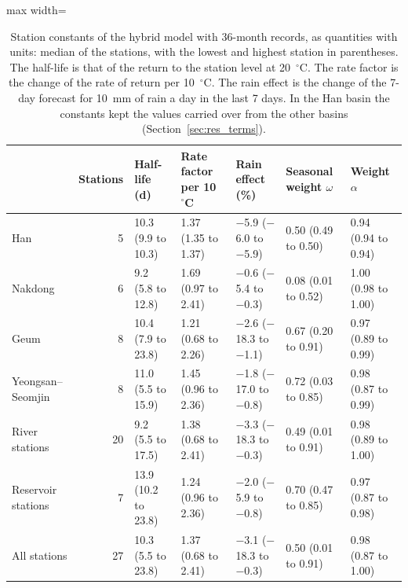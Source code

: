\begin{table}[tbp]
\centering
\caption{Station constants of the hybrid model with 36-month records, as quantities with units: median of the stations, with the lowest and highest station in parentheses. The half-life is that of the return to the station level at 20~$^\circ$C. The rate factor is the change of the rate of return per 10~$^\circ$C. The rain effect is the change of the 7-day forecast for 10~mm of rain a day in the last 7 days. In the Han basin the constants kept the values carried over from the other basins (Section~\ref{sec:res_terms}).}
\label{tab:fitted}
\footnotesize
\setlength{\tabcolsep}{4pt}
\begin{adjustbox}{max width=\textwidth}
\begin{tabular}{lrlllll}
\toprule
 & Stations & Half-life (d) & Rate factor per 10~$^\circ$C & Rain effect (\%) & Seasonal weight $\omega$ & Weight $\alpha$ \\
\midrule
Han & 5 & 10.3 (9.9 to 10.3) & 1.37 (1.35 to 1.37) & $-$5.9 ($-$6.0 to $-$5.9) & 0.50 (0.49 to 0.50) & 0.94 (0.94 to 0.94) \\
Nakdong & 6 & 9.2 (5.8 to 12.8) & 1.69 (0.97 to 2.41) & $-$0.6 ($-$5.4 to $-$0.3) & 0.08 (0.01 to 0.52) & 1.00 (0.98 to 1.00) \\
Geum & 8 & 10.4 (7.9 to 23.8) & 1.21 (0.68 to 2.26) & $-$2.6 ($-$18.3 to $-$1.1) & 0.67 (0.20 to 0.91) & 0.97 (0.89 to 0.99) \\
Yeongsan--Seomjin & 8 & 11.0 (5.5 to 15.9) & 1.45 (0.96 to 2.36) & $-$1.8 ($-$17.0 to $-$0.8) & 0.72 (0.03 to 0.85) & 0.98 (0.87 to 0.99) \\
\midrule
River stations & 20 & 9.2 (5.5 to 17.5) & 1.38 (0.68 to 2.41) & $-$3.3 ($-$18.3 to $-$0.3) & 0.49 (0.01 to 0.91) & 0.98 (0.89 to 1.00) \\
Reservoir stations & 7 & 13.9 (10.2 to 23.8) & 1.24 (0.96 to 2.36) & $-$2.0 ($-$5.9 to $-$0.8) & 0.70 (0.47 to 0.85) & 0.97 (0.87 to 0.98) \\
\midrule
All stations & 27 & 10.3 (5.5 to 23.8) & 1.37 (0.68 to 2.41) & $-$3.1 ($-$18.3 to $-$0.3) & 0.50 (0.01 to 0.91) & 0.98 (0.87 to 1.00) \\
\bottomrule
\end{tabular}
\end{adjustbox}
\end{table}
